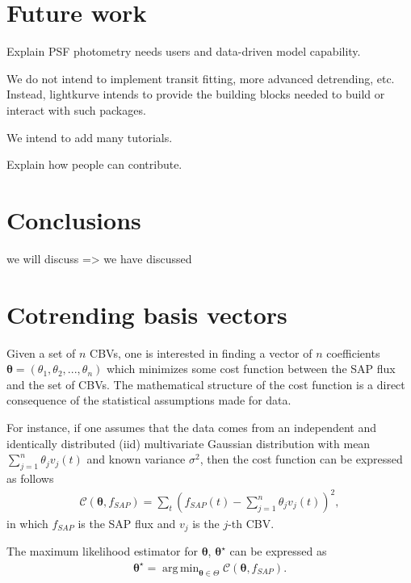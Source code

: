 \documentclass[twocolumn]{aastex62}
\DeclareMathOperator*{\argmin}{arg\,min}
\begin{document}
\section{Future work}

Explain PSF photometry needs users and data-driven model capability.

We do not intend to implement transit fitting, more advanced detrending, etc.
Instead, lightkurve intends to provide the building blocks needed to build
or interact with such packages.

We intend to add many tutorials.

Explain how people can contribute.


\section{Conclusions}

we will discuss => we have discussed






\appendix
\section{Cotrending basis vectors}
\label{appendix:cbvs}

Given a set of $n$ CBVs, one is interested in finding a vector of $n$
coefficients $\bm{\theta}=(\theta_1, \theta_2, ..., \theta_n)$ which minimizes
some cost function between the SAP flux and the set of CBVs. The mathematical
structure of the cost function is a direct consequence of the statistical
assumptions made for data.

For instance, if one assumes that the data comes from an independent and
identically distributed (iid) multivariate Gaussian distribution with mean
$\sum_{j=1}^{n}\theta_j v_{j}(t)$ and known variance $\sigma^2$, then the
cost function can be expressed as follows
\begin{align}
    \mathcal{C}(\bm{\theta}, f_{SAP}) = \sum_{t}\left(f_{SAP}(t)
    - \sum_{j=1}^{n}\theta_j v_{j}(t)\right)^2,
\label{eq:chi-square}
\end{align}
in which $f_{SAP}$ is the SAP flux and $v_j$ is the $j$-th CBV.

The maximum likelihood estimator for $\bm{\theta}$, $\bm{\theta^{\star}}$ can be
expressed as
\begin{align}
    \bm{\theta}^{\star} = \argmin_{\bm{\theta} \in \Theta} \mathcal{C}(\bm{\theta}, f_{SAP}).
\end{align}
\end{document}
